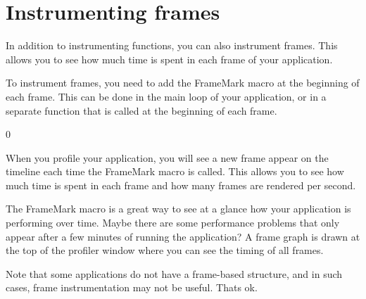 \chapter{Instrumenting frames }
\hypertarget{md__mono_engine_2thirdparty_2tracy_2profiler_2src_2achievements_2_instrument_frames}{}\label{md__mono_engine_2thirdparty_2tracy_2profiler_2src_2achievements_2_instrument_frames}
\label{md__mono_engine_2thirdparty_2tracy_2profiler_2src_2achievements_2_instrument_frames_autotoc_md1110}%
%


In addition to instrumenting functions, you can also instrument frames. This allows you to see how much time is spent in each frame of your application.

To instrument frames, you need to add the {\ttfamily Frame\+Mark} macro at the beginning of each frame. This can be done in the main loop of your application, or in a separate function that is called at the beginning of each frame.


\begin{DoxyCode}{0}
\DoxyCodeLine{}
\DoxyCodeLine{\{}
\DoxyCodeLine{\ \ \ \ \textcolor{comment}{//\ Render\ the\ frame}}
\DoxyCodeLine{\}}

\end{DoxyCode}


When you profile your application, you will see a new frame appear on the timeline each time the {\ttfamily Frame\+Mark} macro is called. This allows you to see how much time is spent in each frame and how many frames are rendered per second.

The {\ttfamily Frame\+Mark} macro is a great way to see at a glance how your application is performing over time. Maybe there are some performance problems that only appear after a few minutes of running the application? A frame graph is drawn at the top of the profiler window where you can see the timing of all frames.

Note that some applications do not have a frame-\/based structure, and in such cases, frame instrumentation may not be useful. That\textquotesingle{}s ok. 